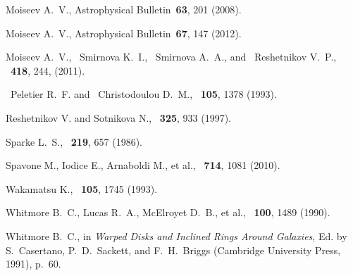 \documentclass{ab}
\begin{document}
\begin{thebibliography}{}
Moiseev  A.~V., Astrophysical Bulletin\ \textbf{63}, 201 (2008).

Moiseev  A.~V., Astrophysical Bulletin\ \textbf{67}, 147 (2012).

Moiseev  A.~V., ~Smirnova K.~I., ~Smirnova A.~A., and ~Reshetnikov V.~P., \mnras\ \textbf{418}, 244, (2011).

~Peletier  R.~F. and ~Christodoulou D.~M., \aj\ \textbf{105}, 1378 (1993).

Reshetnikov  V. and Sotnikova N., \aap\ \textbf{325}, 933 (1997).

Sparke  L.~S., \mnras\ \textbf{219}, 657 (1986).

Spavone  M., Iodice E., Arnaboldi M.,  et al., \aj\ \textbf{714}, 1081 (2010).


Wakamatsu  K., \aj\ \textbf{105}, 1745 (1993).

 Whitmore B.~C., Lucas R.~A., McElroyet D.~B., et al., \aj\ \textbf{100}, 1489 (1990).

Whitmore B.~C., in \textit{Warped Disks and Inclined Rings Around Galaxies}, Ed. by S.~Casertano, P.~D.~Sackett, and F.~H.~Briggs  (Cambridge University Press, 1991), p.~60.

\end{thebibliography}
\end{document}
